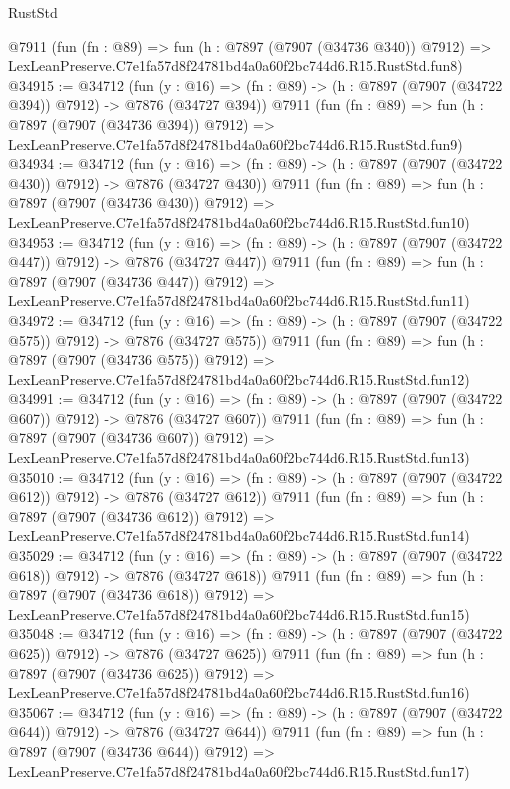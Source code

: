 \begin{lexlean}{RustStd}
\begin{coremodule}
    @7911
    (fun (fn : @89) =>
    fun (h : @7897 (@7907 (@34736 @340)) @7912) =>
    LexLeanPreserve.C7e1fa57d8f24781bd4a0a60f2bc744d6.R15.RustStd.fun8)
@34915 := @34712
    (fun (y : @16) => (fn : @89) -> (h : @7897 (@7907 (@34722 @394)) @7912) -> @7876 (@34727 @394))
    @7911
    (fun (fn : @89) =>
    fun (h : @7897 (@7907 (@34736 @394)) @7912) =>
    LexLeanPreserve.C7e1fa57d8f24781bd4a0a60f2bc744d6.R15.RustStd.fun9)
@34934 := @34712
    (fun (y : @16) => (fn : @89) -> (h : @7897 (@7907 (@34722 @430)) @7912) -> @7876 (@34727 @430))
    @7911
    (fun (fn : @89) =>
    fun (h : @7897 (@7907 (@34736 @430)) @7912) =>
    LexLeanPreserve.C7e1fa57d8f24781bd4a0a60f2bc744d6.R15.RustStd.fun10)
@34953 := @34712
    (fun (y : @16) => (fn : @89) -> (h : @7897 (@7907 (@34722 @447)) @7912) -> @7876 (@34727 @447))
    @7911
    (fun (fn : @89) =>
    fun (h : @7897 (@7907 (@34736 @447)) @7912) =>
    LexLeanPreserve.C7e1fa57d8f24781bd4a0a60f2bc744d6.R15.RustStd.fun11)
@34972 := @34712
    (fun (y : @16) => (fn : @89) -> (h : @7897 (@7907 (@34722 @575)) @7912) -> @7876 (@34727 @575))
    @7911
    (fun (fn : @89) =>
    fun (h : @7897 (@7907 (@34736 @575)) @7912) =>
    LexLeanPreserve.C7e1fa57d8f24781bd4a0a60f2bc744d6.R15.RustStd.fun12)
@34991 := @34712
    (fun (y : @16) => (fn : @89) -> (h : @7897 (@7907 (@34722 @607)) @7912) -> @7876 (@34727 @607))
    @7911
    (fun (fn : @89) =>
    fun (h : @7897 (@7907 (@34736 @607)) @7912) =>
    LexLeanPreserve.C7e1fa57d8f24781bd4a0a60f2bc744d6.R15.RustStd.fun13)
@35010 := @34712
    (fun (y : @16) => (fn : @89) -> (h : @7897 (@7907 (@34722 @612)) @7912) -> @7876 (@34727 @612))
    @7911
    (fun (fn : @89) =>
    fun (h : @7897 (@7907 (@34736 @612)) @7912) =>
    LexLeanPreserve.C7e1fa57d8f24781bd4a0a60f2bc744d6.R15.RustStd.fun14)
@35029 := @34712
    (fun (y : @16) => (fn : @89) -> (h : @7897 (@7907 (@34722 @618)) @7912) -> @7876 (@34727 @618))
    @7911
    (fun (fn : @89) =>
    fun (h : @7897 (@7907 (@34736 @618)) @7912) =>
    LexLeanPreserve.C7e1fa57d8f24781bd4a0a60f2bc744d6.R15.RustStd.fun15)
@35048 := @34712
    (fun (y : @16) => (fn : @89) -> (h : @7897 (@7907 (@34722 @625)) @7912) -> @7876 (@34727 @625))
    @7911
    (fun (fn : @89) =>
    fun (h : @7897 (@7907 (@34736 @625)) @7912) =>
    LexLeanPreserve.C7e1fa57d8f24781bd4a0a60f2bc744d6.R15.RustStd.fun16)
@35067 := @34712
    (fun (y : @16) => (fn : @89) -> (h : @7897 (@7907 (@34722 @644)) @7912) -> @7876 (@34727 @644))
    @7911
    (fun (fn : @89) =>
    fun (h : @7897 (@7907 (@34736 @644)) @7912) =>
    LexLeanPreserve.C7e1fa57d8f24781bd4a0a60f2bc744d6.R15.RustStd.fun17)

\end{coremodule}
\end{lexlean}

